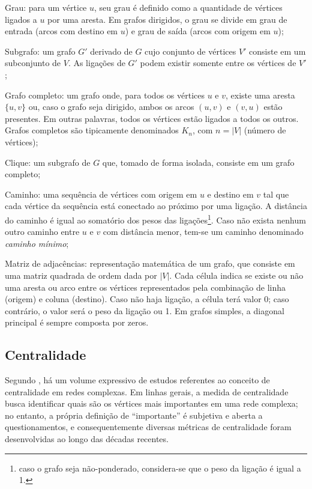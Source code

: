 \begin{alineas}
    \item Grau: para um vértice $u$, seu grau é definido como a quantidade de vértices ligados a $u$ por uma aresta. Em grafos dirigidos, o grau se divide em grau de entrada (arcos com destino em $u$) e grau de saída (arcos com origem em $u$);
    \item Subgrafo: um grafo $G'$ derivado de $G$ cujo conjunto de vértices $V'$ consiste em um subconjunto de $V$. As ligações de $G'$ podem existir somente entre os vértices de $V'$;
    \item Grafo completo: um grafo onde, para todos os vértices $u$ e $v$, existe uma aresta $\{u, v\}$ ou, caso o grafo seja dirigido, ambos os arcos $(u, v)$ e $(v, u)$ estão presentes. Em outras palavras, todos os vértices estão ligados a todos os outros. Grafos completos são tipicamente denominados $K_n$, com $n = |V|$ (número de vértices);
    \item Clique: um subgrafo de $G$ que, tomado de forma isolada, consiste em um grafo completo; %
    \item Caminho: uma sequência de vértices com origem em $u$ e destino em $v$ tal que cada vértice da sequência está conectado ao próximo por uma ligação. A distância do caminho é igual ao somatório dos pesos das ligações\footnote{caso o grafo seja não-ponderado, considera-se que o peso da ligação é igual a 1.}. Caso não exista nenhum outro caminho entre $u$ e $v$ com distância menor, tem-se um caminho denominado \emph{caminho mínimo};
    \item Matriz de adjacências: representação matemática de um grafo, que consiste em uma matriz quadrada de ordem dada por $|V|$. Cada célula indica se existe ou não uma aresta ou arco entre os vértices representados pela combinação de linha (origem) e coluna (destino). Caso não haja ligação, a célula terá valor 0; caso contrário, o valor será o peso da ligação ou 1. Em grafos simples, a diagonal principal é sempre composta por zeros.
\end{alineas}

\subsection{Centralidade} \label{sec:centrality}

Segundo \cite{Newman2010}, há um volume expressivo de estudos referentes ao conceito de centralidade em redes complexas. Em linhas gerais, a medida de centralidade busca identificar quais são os vértices mais importantes em uma rede complexa; no entanto, a própria definição de ``importante'' é subjetiva e aberta a questionamentos, e consequentemente diversas métricas de centralidade foram desenvolvidas ao longo das décadas recentes.

